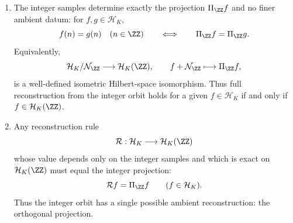 \begin{lemma}
\begin{enumerate}[label=(\roman*)]
      \[
      \sum_{m\in\ZZ}\widehat f(\theta+2\pi m)
      \]
      converges absolutely and
      \begin{equation}\label{eq:lattice-alias-projection}
      q_{\Pi_{\ZZ}f}(\theta)
      =\frac{\displaystyle\sum_{m\in\ZZ}
      \widehat f(\theta+2\pi m)}
      {\Sigma_1(\theta)},
      \end{equation}
      equivalently
      \begin{equation}\label{eq:integer-orbit-projection-symbol}
      q_{\Pi_{\ZZ}f}(\theta)
      =
      \frac{\displaystyle\sum_{m\in\ZZ}\widehat f(\theta+2\pi m)}
      {\displaystyle\sum_{m\in\ZZ}e^{-2|\theta+2\pi m|}},
      \qquad -\pi\le\theta\le\pi,
      \end{equation}
      with $q_{\Pi_{\ZZ}f}$ extended $2\pi$-periodically to~$\RR$.
      Equivalently,
      \[
      \widehat{\Pi_{\ZZ}f}(\xi)=e^{-2\abs{\xi}}q_{\Pi_{\ZZ}f}(\xi)
      \qquad\text{for a.e. }\xi\in\RR.
      \]
      Moreover,
      \begin{equation}\label{eq:lattice-projection-norm}
      \|\Pi_{\ZZ}f\|_{\mathcal H_K}^2
      =\frac{1}{2\pi^2}\int_I
      \frac{\left|\sum_{m\in\ZZ}
      \widehat f(\theta+2\pi m)\right|^2}
      {\Sigma_1(\theta)}\,\dd\theta,
      \end{equation}
      and $\Pi_{\ZZ}f$ is the unique element of~$\mathcal H_K(\ZZ)$
      satisfying
      \[
      (\Pi_{\ZZ}f)(n)=f(n)
      \qquad(n\in\ZZ).
      \]
\item
      The integer samples determine exactly the projection $\Pi_{\ZZ}f$ and
      no finer ambient datum: for $f,g\in\mathcal H_K$,
      \begin{equation}\label{eq:uniform-lattice-quotient-rigidity}
      f(n)=g(n)\quad(n\in\ZZ)
      \qquad\Longleftrightarrow\qquad
      \Pi_{\ZZ}f=\Pi_{\ZZ}g .
      \end{equation}
      Equivalently,
      \[
      \mathcal H_K/\mathcal N_{\ZZ}\longrightarrow\mathcal H_K(\ZZ),
      \qquad
      f+\mathcal N_{\ZZ}\longmapsto\Pi_{\ZZ}f,
      \]
      is a well-defined isometric Hilbert-space isomorphism.  Thus full
      reconstruction from the integer orbit holds for a given
      $f\in\mathcal H_K$ if and only if $f\in\mathcal H_K(\ZZ)$.
\item
      Any reconstruction rule
      \[
      \mathcal R:\mathcal H_K\longrightarrow \mathcal H_K(\ZZ)
      \]
      whose value depends only on the integer samples and which is exact on
      $\mathcal H_K(\ZZ)$ must equal the integer projection:
      \[
      \mathcal Rf=\Pi_{\ZZ}f\qquad(f\in\mathcal H_K).
      \]
      Thus the integer orbit has a single possible ambient reconstruction:
      the orthogonal projection.
\end{enumerate}
\end{lemma}

